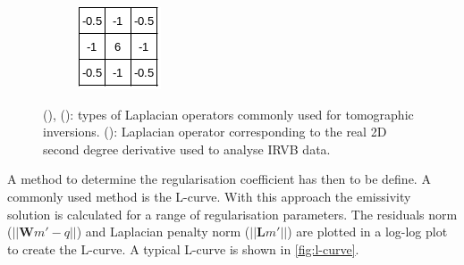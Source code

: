 \begin{figure}
\begin{subfigure}{0.2\linewidth}
         \caption{}
         \label{fig:Laplacian_std2}
     \end{subfigure}
     \hfill
     \begin{subfigure}{0.2\linewidth}
         \centering
         \includegraphics[trim={0 4 4 0},clip,width=\textwidth]{Chapters/chapter2/figs/Laplacian_IRVB.png}
         \caption{}
         \label{fig:Laplacian_IRVB}
     \end{subfigure}
    \caption{(), (): types of Laplacian operators commonly used for tomographic inversions.\cite{Fisher2004} (): Laplacian operator corresponding to the real 2D second degree derivative used to analyse IRVB data.}
    \label{fig:Laplacian}
\end{figure}

A method to determine the regularisation coefficient has then to be define. A commonly used method is the L-curve.\cite{Schou2015} With this approach the emissivity solution is calculated for a range of regularisation parameters. The residuals norm ($||\bm{W}m'-q||$) and Laplacian penalty norm ($||\bm{L}m'||$) are plotted in a log-log plot to create the L-curve. A typical L-curve is shown in \autoref{fig:l-curve}.

